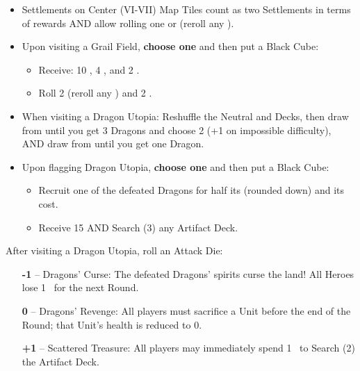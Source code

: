 \begin{multicols*}{2}
\begin{itemize}
  \item Settlements on Center (VI-VII) Map Tiles count as two Settlements in terms of rewards AND allow rolling one  or  (reroll any ).
  
  \item Upon visiting a Grail Field, \textbf{choose one} and then put a Black Cube:
  \begin{itemize}
    \item Receive: 10 , 4 , and 2 .
    \item Roll 2  (reroll any ) and 2 .
  \end{itemize}
  
  \item When visiting a Dragon Utopia: Reshuffle the Neutral  and  Decks, then draw from  until you get 3 Dragons and choose 2 (+1 on impossible difficulty), AND draw from  until you get one Dragon.
  \item Upon flagging Dragon Utopia, \textbf{choose one} and then put a Black Cube:
  \begin{itemize}
    \item Recruit one of the defeated Dragons for half its  (rounded down) and its  cost.
    \item Receive 15  AND Search (3) any Artifact Deck.
  \end{itemize}
\end{itemize}
After visiting a Dragon Utopia, roll an Attack Die:
\begin{itemize}
  \item[\textbf{-1}] -- Dragons' Curse: The defeated Dragons’ spirits curse the land! All Heroes lose \mbox{1 } for the next Round.
  \item[\textbf{0}] -- Dragons' Revenge: All players must sacrifice a Unit before the end of the Round; that Unit's health is reduced to 0. 
  \item[ \textbf{+1}] -- Scattered Treasure: All players may immediately spend \mbox{1 } to Search (2) the Artifact Deck.
\end{itemize}


\end{multicols*}
